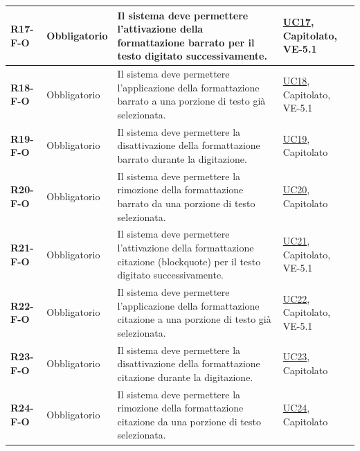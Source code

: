 \begin{longtable}{|p{2.5cm}|p{2.2cm}|p{6.8cm}|p{2.7cm}|}
	\textbf{R17-F-O} & Obbligatorio & Il sistema deve permettere l'attivazione della formattazione barrato per il testo digitato successivamente. & \hyperlink{uc17}{UC17}, Capitolato, VE-5.1 \\ \hline
	\textbf{R18-F-O} & Obbligatorio & Il sistema deve permettere l'applicazione della formattazione barrato a una porzione di testo già selezionata. & \hyperlink{uc18}{UC18}, Capitolato, VE-5.1 \\ \hline
	\textbf{R19-F-O} & Obbligatorio & Il sistema deve permettere la disattivazione della formattazione barrato durante la digitazione. & \hyperlink{uc19}{UC19}, Capitolato \\ \hline
	\textbf{R20-F-O} & Obbligatorio & Il sistema deve permettere la rimozione della formattazione barrato da una porzione di testo selezionata. & \hyperlink{uc20}{UC20}, Capitolato \\ \hline
	\textbf{R21-F-O} & Obbligatorio & Il sistema deve permettere l'attivazione della formattazione citazione (blockquote) per il testo digitato successivamente. & \hyperlink{uc21}{UC21}, Capitolato, VE-5.1 \\ \hline
	\textbf{R22-F-O} & Obbligatorio & Il sistema deve permettere l'applicazione della formattazione citazione a una porzione di testo già selezionata. & \hyperlink{uc22}{UC22}, Capitolato, VE-5.1 \\ \hline
	\textbf{R23-F-O} & Obbligatorio & Il sistema deve permettere la disattivazione della formattazione citazione durante la digitazione. & \hyperlink{uc23}{UC23}, Capitolato \\ \hline
	\textbf{R24-F-O} & Obbligatorio & Il sistema deve permettere la rimozione della formattazione citazione da una porzione di testo selezionata. & \hyperlink{uc24}{UC24}, Capitolato \\ \hline


\end{longtable}
